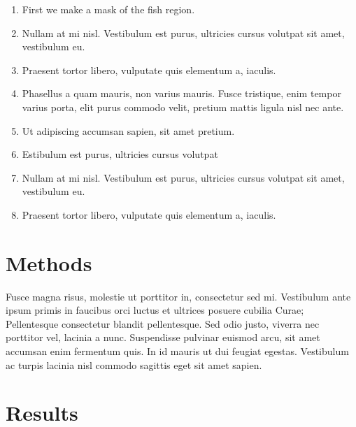 \documentclass[a0,portrait]{a0poster}
\begin{document}
\begin{multicols}{2}
\begin{enumerate}
\item First we make a mask of the fish region.
\item Nullam at mi nisl. Vestibulum est purus, ultricies cursus volutpat sit amet, vestibulum eu.
\item Praesent tortor libero, vulputate quis elementum a, iaculis.
\item Phasellus a quam mauris, non varius mauris. Fusce tristique, enim tempor varius porta, elit purus commodo velit, pretium mattis ligula nisl nec ante.
\item Ut adipiscing accumsan sapien, sit amet pretium.
\item Estibulum est purus, ultricies cursus volutpat
\item Nullam at mi nisl. Vestibulum est purus, ultricies cursus volutpat sit amet, vestibulum eu.
\item Praesent tortor libero, vulputate quis elementum a, iaculis.
\end{enumerate}


\section*{Methods}

Fusce magna risus, molestie ut porttitor in, consectetur sed mi. Vestibulum ante ipsum primis in faucibus orci luctus et ultrices posuere cubilia Curae; Pellentesque consectetur blandit pellentesque. Sed odio justo, viverra nec porttitor vel, lacinia a nunc. Suspendisse pulvinar euismod arcu, sit amet accumsan enim fermentum quis. In id mauris ut dui feugiat egestas. Vestibulum ac turpis lacinia nisl commodo sagittis eget sit amet sapien.




\section*{Results}


\end{multicols}
\end{document}
